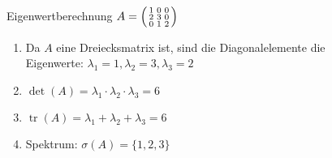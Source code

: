 \begin{example2}{Eigenwertberechnung}
$A = \begin{psmallmatrix} 1 & 0 & 0\\ 2 & 3 & 0\\ 0 & 1 & 2\end{psmallmatrix}$
\begin{enumerate}
    \item Da $A$ eine Dreiecksmatrix ist, sind die Diagonalelemente die \\
    Eigenwerte:
    $\lambda_1 = 1, \lambda_2 = 3, \lambda_3 = 2$
    \item $\det(A) = \lambda_1\cdot\lambda_2\cdot\lambda_3 = 6$
    \item $\operatorname{tr}(A) = \lambda_1 + \lambda_2 + \lambda_3 = 6$
    \item Spektrum: $\sigma(A) = \{1,2,3\}$
\end{enumerate}
\end{example2}